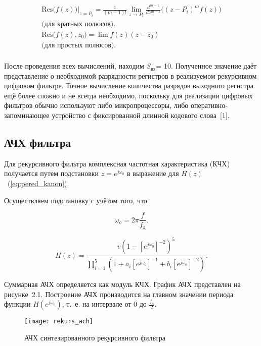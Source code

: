 \begin{gather*}
  \text{Res}\bigl(f(z)\bigr)\Big|_{z=P_i} = \frac{1}{(m-1)!} \lim
  \limits_{z \rightarrow P_i}
  \frac{d^{m-1}}{dz^{m-1}}\bigl((z-P_i)^mf(z)\bigr) \\
  \text{(для кратных полюсов)}.\\
  \text{Res}\bigl(f(z), z_0\bigr) = \lim f(z)(z-z_0) \\
  \text{(для простых полюсов)}.\\
\end{gather*}

После проведения всех вычислений, находим $S_{\text{вх}}$= 10. Полученное
значение даёт представление о необходимой разрядности регистров в
реализуемом рекурсивном цифровом фильтре. Точное вычисление количества
разрядов выходного регистра ещё более сложно и не всегда необходимо,
поскольку для реализации цифровых фильтров обычно используют либо
микропроцессоры, либо оперативно-запоминающее устройство с
фиксированной длинной кодового слова~[1].

\subsection{АЧХ фильтра}

Для рекурсивного фильтра комплексная частотная характеристика (КЧХ)
получается путем подстановки $z = e^{j\omega_0}$ в выражение для
$H(z)$~(\ref{eq:pered_kanon}).

Осуществляем подстановку с учётом того, что

\begin{equation*}
  \omega_o = 2\pi\frac{f}{f_{\text{д}}}.
\end{equation*}

\begin{equation*}
  H(z) = \frac{v(1 -
    \left[e^{j\omega_0}\right]^{-2})^5}{\prod_{i=1}^5\left(1 + a_i
      \left[e^{j\omega_0} \right]^{-1} +b_i
      \left[e^{j\omega_0}\right]^{-2}\right)}.
\end{equation*}

Суммарная АЧХ определяется как модуль КЧХ. График АЧХ представлен на
рисунке~2.1. Построение АЧХ производится на главном
значении периода функции $H(e^{j \omega_0})$, т.~е. на интервале от 0
до $\frac{f_{\text{д}}}{2}$.

\begin{figure}[h!]
  \label{fig:rekurs_ach}
  \texttt{[image: rekurs\_ach]}
  \caption{АЧХ синтезированного рекурсивного фильтра}
\end{figure}

